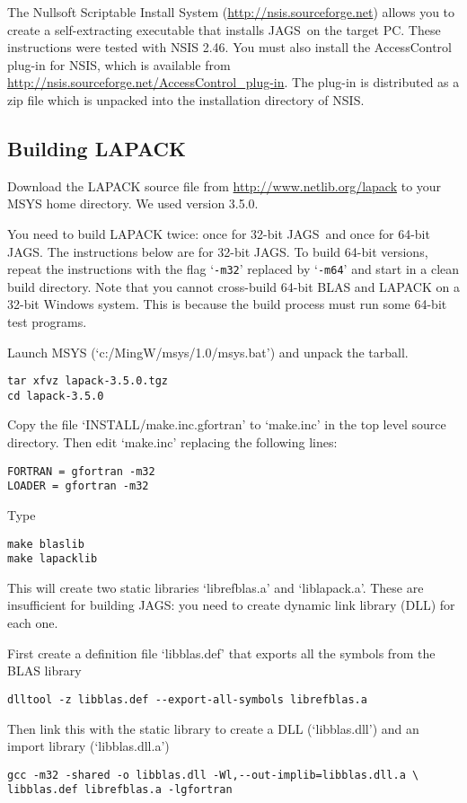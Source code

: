 \documentclass[11pt, a4paper, titlepage]{article}
\newcommand{\JAGS}{\textsf{JAGS}}
\newcommand{\samp}[1]{{`\bgroup\normalfont\texttt{#1}'\egroup}}
\newcommand{\file}[1]{{`\normalfont\textsf{#1}'}}
\let\option=\samp
\begin{document}
The Nullsoft Scriptable Install System
(\url{http://nsis.sourceforge.net}) allows you to create a
self-extracting executable that installs \JAGS\ on the target PC.
These instructions were tested with NSIS 2.46.  You must also install
the AccessControl plug-in for NSIS, which is available from
\url{http://nsis.sourceforge.net/AccessControl_plug-in}. The plug-in
is distributed as a zip file which is unpacked into the installation
directory of NSIS.

\subsection{Building LAPACK}

Download the LAPACK source file from
\url{http://www.netlib.org/lapack} to your MSYS home directory. We
used version 3.5.0.

You need to build LAPACK twice: once for 32-bit \JAGS\ and once for
64-bit \JAGS. The instructions below are for 32-bit \JAGS. To build
64-bit versions, repeat the instructions with the flag \option{-m32}
replaced by \option{-m64} and start in a clean build directory.  Note
that you cannot cross-build 64-bit BLAS and LAPACK on a 32-bit Windows
system. This is because the build process must run some 64-bit test
programs.

Launch MSYS (\file{c:/MingW/msys/1.0/msys.bat}) and unpack the tarball.
\begin{verbatim}
tar xfvz lapack-3.5.0.tgz
cd lapack-3.5.0
\end{verbatim}
Copy the file \file{INSTALL/make.inc.gfortran} to \file{make.inc} in
the top level source directory.  Then edit \file{make.inc} replacing
the following lines:
\begin{verbatim}
FORTRAN = gfortran -m32
LOADER = gfortran -m32
\end{verbatim}
Type
\begin{verbatim}
make blaslib
make lapacklib 
\end{verbatim}
This will create two static libraries \file{librefblas.a} and
\file{liblapack.a}. These are insufficient for building \JAGS: you
need to create dynamic link library (DLL) for each one.

First create a definition file \file{libblas.def} that exports all the
symbols from the BLAS library
\begin{verbatim}
dlltool -z libblas.def --export-all-symbols librefblas.a
\end{verbatim}
Then link this with the static library to create a DLL
(\file{libblas.dll}) and an import library (\file{libblas.dll.a})
\begin{verbatim}
gcc -m32 -shared -o libblas.dll -Wl,--out-implib=libblas.dll.a \
libblas.def librefblas.a -lgfortran 
\end{verbatim}
 
\end{document}
